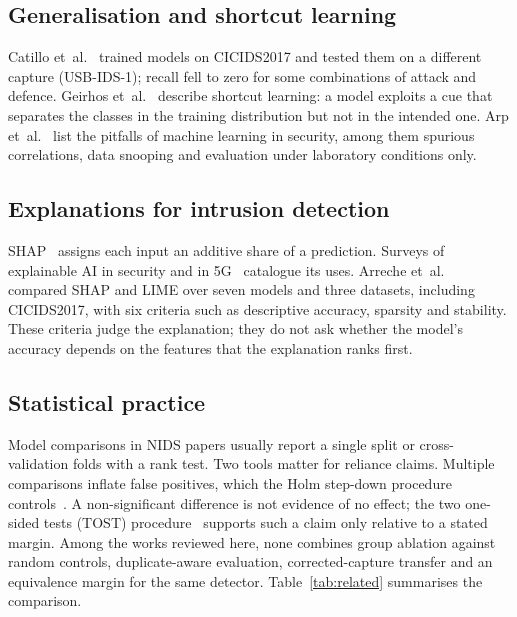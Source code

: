\documentclass[journal]{IEEEtran}
\begin{document}
\subsection{Generalisation and shortcut learning}
Catillo et~al.~\cite{catillo2023} trained models on CICIDS2017 and tested them on a different
capture (USB-IDS-1); recall fell to zero for some combinations of attack and defence.
Geirhos et~al.~\cite{geirhos2020} describe shortcut learning: a model exploits a cue that separates the
classes in the training distribution but not in the intended one. Arp et~al.~\cite{arp2022} list
the pitfalls of machine learning in security, among them spurious correlations, data snooping and
evaluation under laboratory conditions only.

\subsection{Explanations for intrusion detection}
SHAP~\cite{lundberg2017} assigns each input an additive share of a prediction. Surveys of
explainable AI in security and in 5G~\cite{kalasampath2025,senevirathna2024} catalogue its uses.
Arreche et~al.~\cite{arreche2024} compared SHAP and LIME over seven models and three datasets,
including CICIDS2017, with six criteria such as descriptive accuracy, sparsity and stability.
These criteria judge the explanation; they do not ask whether the model's accuracy depends on the
features that the explanation ranks first.

\subsection{Statistical practice}
Model comparisons in NIDS papers usually report a single split or cross-validation folds with a
rank test. Two tools matter for reliance claims. Multiple comparisons inflate false positives,
which the Holm step-down procedure controls~\cite{holm1979}. A non-significant difference is not
evidence of no effect; the two one-sided tests (TOST) procedure~\cite{schuirmann1987} supports such
a claim only relative to a stated margin. Among the works reviewed here, none combines group
ablation against random controls, duplicate-aware evaluation, corrected-capture transfer and an
equivalence margin for the same detector. Table~\ref{tab:related} summarises the comparison.
\end{document}
